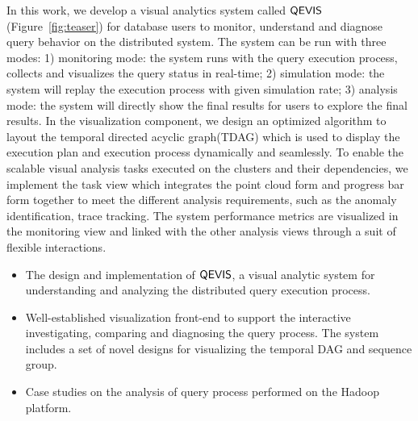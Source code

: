 In this work, we develop a visual analytics system called $\mathsf{QEVIS}$ (Figure~\ref{fig:teaser}) for database users to monitor, understand and diagnose query behavior on the distributed system. The system can be run with three modes: 1) monitoring mode: the system runs with the query execution process, collects and visualizes the query status in real-time; 2) simulation mode: the system will replay the execution process with given simulation rate; 3) analysis mode: the system will directly show the final results for users to explore the final results. In the visualization component, we design an optimized algorithm to layout the temporal directed acyclic graph(TDAG) which is used to display the execution plan and execution process dynamically and seamlessly. To enable the scalable visual analysis tasks executed on the clusters and their dependencies, we implement the task view which integrates the point cloud form and progress bar form together to meet the different analysis requirements, such as the anomaly identification, trace tracking. The system performance metrics are visualized in the monitoring view and linked with the other analysis views through a suit of flexible interactions. 


\begin{itemize}
\item The design and implementation of $\mathsf{QEVIS}$, a visual analytic system for understanding and analyzing the distributed query execution process.
\item Well-established visualization front-end to support the interactive investigating, comparing and diagnosing the query process. The system includes a set of novel designs for visualizing the temporal DAG and sequence group.
\item Case studies on the analysis of query process performed on the Hadoop platform.
\end{itemize}